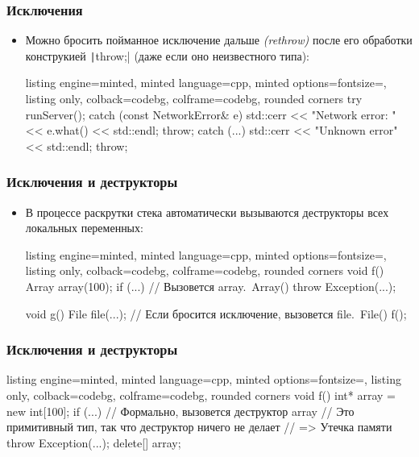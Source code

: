 \documentclass[10pt]{beamer}
\begin{document}
\begin{frame}[fragile]
\frametitle{Исключения}
\begin{itemize}
\item Можно бросить пойманное исключение дальше \textit{(rethrow)} после его обработки конструкией \texttt|throw;| (даже если оно неизвестного типа):
\begin{tcblisting}{listing engine=minted, minted language=cpp, minted options={fontsize=\scriptsize}, listing only, colback=codebg, colframe=codebg, rounded corners}
try {
  runServer();
}
catch (const NetworkError& e) {
  std::cerr << "Network error: " << e.what() << std::endl;
  throw;
}
catch (...) {
  std::cerr << "Unknown error" << std::endl;
  throw;
}
\end{tcblisting}
\end{itemize}
\end{frame}

\begin{frame}[fragile]
\frametitle{Исключения и деструкторы}
\begin{itemize}
\item В процессе раскрутки стека автоматически вызываются деструкторы всех локальных переменных:
\begin{tcblisting}{listing engine=minted, minted language=cpp, minted options={fontsize=\scriptsize}, listing only, colback=codebg, colframe=codebg, rounded corners}
void f() {
  Array array(100);
  if (...) {
    // Вызовется array.~Array()
    throw Exception(...);
  }
}

void g() {
  File file(...);
  // Если бросится исключение, вызовется file.~File()
  f();
}
\end{tcblisting}
\end{itemize}
\end{frame}

\begin{frame}[fragile]
\frametitle{Исключения и деструкторы}
\begin{itemize}
\begin{tcblisting}{listing engine=minted, minted language=cpp, minted options={fontsize=\scriptsize}, listing only, colback=codebg, colframe=codebg, rounded corners}
void f() {
  int* array = new int[100];
  if (...) {
    // Формально, вызовется деструктор array
    // Это примитивный тип, так что деструктор ничего не делает
    // => Утечка памяти
    throw Exception(...);
  }
  delete[] array;
}
\end{tcblisting}
\end{itemize}
\end{frame}
\end{document}
